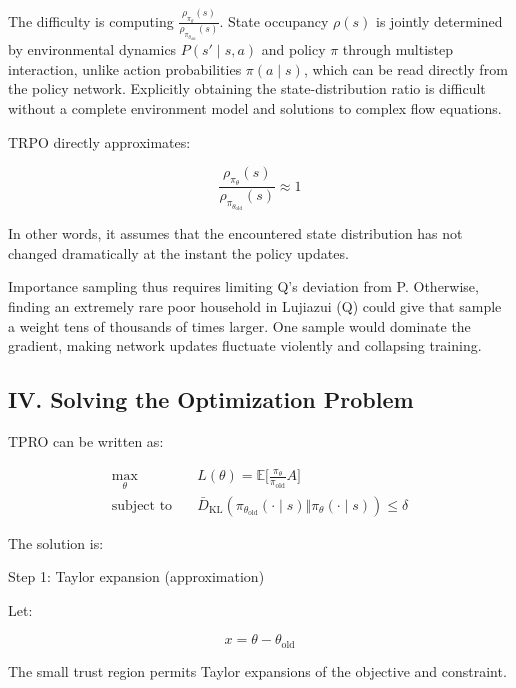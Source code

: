 The difficulty is computing \(\frac{\rho_{\pi_\theta}(s)}{\rho_{\pi_{\theta_{\mathrm{old}}}}(s)}\). State occupancy \(\rho(s)\) is jointly determined by environmental dynamics \(P(s'\mid s,a)\) and policy \(\pi\) through multistep interaction, unlike action probabilities \(\pi(a\mid s)\), which can be read directly from the policy network. Explicitly obtaining the state-distribution ratio is difficult without a complete environment model and solutions to complex flow equations.

TRPO directly approximates:

\[
\frac{\rho_{\pi_\theta}(s)}{\rho_{\pi_{\theta_{\mathrm{old}}}}(s)}\approx 1
\]

In other words, it assumes that the encountered state distribution has not changed dramatically at the instant the policy updates.

Importance sampling thus requires limiting Q's deviation from P. Otherwise, finding an extremely rare poor household in Lujiazui (Q) could give that sample a weight tens of thousands of times larger. One sample would dominate the gradient, making network updates fluctuate violently and collapsing training.

\hypertarget{iv.-solving-the-optimization-problem}{%
\subsection{IV. Solving the Optimization Problem}\label{iv.-solving-the-optimization-problem}}

TPRO can be written as:

\[
\begin{aligned}
\max_\theta\quad
& L(\theta)=\mathbb{E}
\bigl[
\frac{\pi_\theta}{\pi_{\mathrm{old}}}A
\bigr] \\
\text{subject to}\quad
& \bar{D}_{\mathrm{KL}}(
\pi_{\theta_{\mathrm{old}}}(\cdot\mid s)
\Vert
\pi_\theta(\cdot\mid s)
)\le \delta
\end{aligned}
\]

The solution is:

Step 1: Taylor expansion (approximation)

Let:

\[
x=\theta-\theta_{\mathrm{old}}
\]

The small trust region permits Taylor expansions of the objective and constraint.

